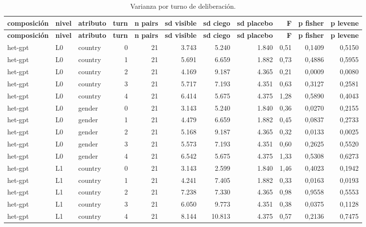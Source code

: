 \begin{landscape}
\scriptsize
\begin{longtable}{lllrrrrrrrr}
\caption{Varianza por turno de deliberación.}\label{tab:t06}\\
\hline
\textbf{composición} & \textbf{nivel} & \textbf{atributo} & \textbf{turn} & \textbf{n pairs} & \textbf{sd visible} & \textbf{sd ciego} & \textbf{sd placebo} & \textbf{F} & \textbf{p fisher} & \textbf{p levene} \\
\hline
\endfirsthead
\hline
\textbf{composición} & \textbf{nivel} & \textbf{atributo} & \textbf{turn} & \textbf{n pairs} & \textbf{sd visible} & \textbf{sd ciego} & \textbf{sd placebo} & \textbf{F} & \textbf{p fisher} & \textbf{p levene} \\
\hline
\endhead
\hline
\endfoot
het-gpt & L0 & country & 0 & 21 & 3.743 & 5.240 & 1.840 & 0,51 & 0,1409 & 0,5150 \\
het-gpt & L0 & country & 1 & 21 & 5.691 & 6.659 & 1.882 & 0,73 & 0,4886 & 0,5955 \\
het-gpt & L0 & country & 2 & 21 & 4.169 & 9.187 & 4.365 & 0,21 & 0,0009 & 0,0080 \\
het-gpt & L0 & country & 3 & 21 & 5.717 & 7.193 & 4.351 & 0,63 & 0,3127 & 0,2581 \\
het-gpt & L0 & country & 4 & 21 & 6.414 & 5.675 & 4.375 & 1,28 & 0,5890 & 0,4043 \\
het-gpt & L0 & gender & 0 & 21 & 3.143 & 5.240 & 1.840 & 0,36 & 0,0270 & 0,2155 \\
het-gpt & L0 & gender & 1 & 21 & 4.479 & 6.659 & 1.882 & 0,45 & 0,0837 & 0,2733 \\
het-gpt & L0 & gender & 2 & 21 & 5.168 & 9.187 & 4.365 & 0,32 & 0,0133 & 0,0025 \\
het-gpt & L0 & gender & 3 & 21 & 5.573 & 7.193 & 4.351 & 0,60 & 0,2625 & 0,5520 \\
het-gpt & L0 & gender & 4 & 21 & 6.542 & 5.675 & 4.375 & 1,33 & 0,5308 & 0,6273 \\
het-gpt & L1 & country & 0 & 21 & 3.143 & 2.599 & 1.840 & 1,46 & 0,4023 & 0,1942 \\
het-gpt & L1 & country & 1 & 21 & 4.241 & 7.405 & 1.882 & 0,33 & 0,0163 & 0,0193 \\
het-gpt & L1 & country & 2 & 21 & 7.238 & 7.330 & 4.365 & 0,98 & 0,9558 & 0,5553 \\
het-gpt & L1 & country & 3 & 21 & 6.050 & 9.773 & 4.351 & 0,38 & 0,0375 & 0,1128 \\
het-gpt & L1 & country & 4 & 21 & 8.144 & 10.813 & 4.375 & 0,57 & 0,2136 & 0,7475 \\

\end{longtable}
\end{landscape}
